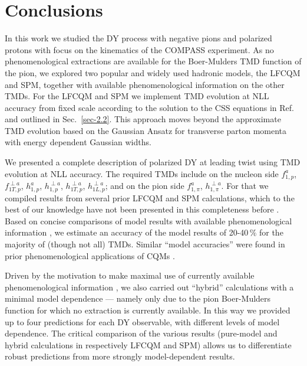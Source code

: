 \documentclass[a4paper]{article}
\begin{document}
\section{Conclusions}
\label{sec-4}

In this work we studied the DY process with negative pions 
and polarized protons with focus on the kinematics of the 
COMPASS experiment. As no phenomenological extractions are 
available for the Boer-Mulders TMD
function of the pion, we explored two popular and widely used
hadronic models, the LFCQM and SPM, together with available
phenomenological information on the other TMDs. For the LFCQM and SPM we implement TMD evolution at NLL accuracy from fixed scale according to the solution to the CSS equations in Ref.~\cite{Collins:2014jpa} and outlined in Sec.~\ref{sec-2.2}. This approach moves beyond the approximate TMD evolution based on the Gaussian Ansatz for transverse parton momenta with
energy dependent Gaussian widths.

We presented a complete description of polarized DY at leading 
twist using TMD evolution at NLL accuracy. 
The required TMDs include on the nucleon side
$f_{1,p}^{a}$, $f_{1T,p}^{\perp a}$,
$h_{1,p}^{a}$, $h_{1,p}^{\perp a}$, 
$h_{1T,p}^{\perp a}$, $h_{1L,p}^{\perp a}$;
and on the pion side
$f_{1,\pi}^a$, $h_{1,\pi}^{\perp a}$.
For that we compiled results from several prior LFCQM and SPM
calculations, which to the best of our knowledge have not been 
presented in this completeness before
\cite{Jakob:1997wg,Pasquini:2010af,Pasquini:2008ax,Pasquini:2014ppa,Gamberg:2007wm,Gamberg:2009uk}. 
Based on concise comparisons of model results with 
available phenomenological information 
\cite{Martin:2009iq,Sutton:1991ay,Anselmino:2011gs,Anselmino:2013vqa,Barone:2009hw,Lefky:2014eia,Cammarota:2020qcw,Bastami:2018xqd},
we estimate an accuracy of the model results of
20-40$\,\%$ for the majority of (though not all) TMDs. Similar  
``model accuracies'' were found  in prior phenomenological 
applications of CQMs \cite{Boffi:2009sh,Pasquini:2011tk,Pasquini:2014ppa}.

Driven by the motivation to make maximal use of currently 
available phenomenological information
\cite{Martin:2009iq,Sutton:1991ay,Anselmino:2011gs,Anselmino:2013vqa,Barone:2009hw,Lefky:2014eia,Cammarota:2020qcw,Bastami:2018xqd}, 
we also carried out ``hybrid'' calculations with a minimal model 
dependence --- namely only due to the pion Boer-Mulders function 
for which no extraction is currently available. 
In this way we provided up to four predictions 
for each DY observable, with different levels of model dependence. 
The critical comparison of the various results 
(pure-model and hybrid calculations in respectively LFCQM and SPM) 
allows us to differentiate robust predictions from more strongly
model-dependent results. 
\end{document}
